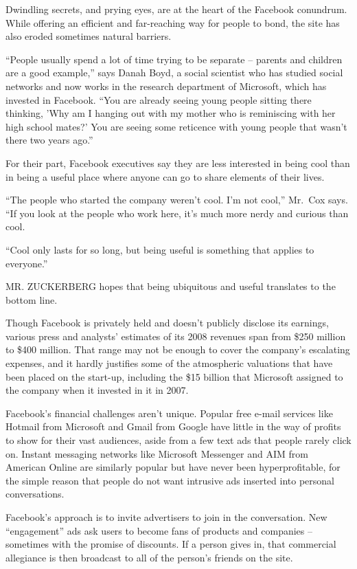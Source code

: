 \documentclass[12pt,a4paper,onecolumn]{article}
\begin{document}
Dwindling secrets, and prying eyes, are at the heart of the Facebook conundrum. While offering an
efficient and far-reaching way for people to bond, the site has also eroded sometimes natural
barriers.

``People usually spend a lot of time trying to be separate -- parents and children are a good
example,'' says Danah Boyd, a social scientist who has studied social networks and now works in the
research department of Microsoft, which has invested in Facebook. ``You are already seeing young
people sitting there thinking, 'Why am I hanging out with my mother who is reminiscing with her high
school mates?' You are seeing some reticence with young people that wasn't there two years ago.''

For their part, Facebook executives say they are less interested in being cool than in being a
useful place where anyone can go to share elements of their lives.

``The people who started the company weren't cool. I'm not cool,'' Mr.~Cox says. ``If you look at
the people who work here, it's much more nerdy and curious than cool.

``Cool only lasts for so long, but being useful is something that applies to everyone.''

MR. ZUCKERBERG hopes that being ubiquitous and useful translates to the bottom line.

Though Facebook is privately held and doesn't publicly disclose its earnings, various press and
analysts' estimates of its 2008 revenues span from \$250 million to \$400 million. That range may
not be enough to cover the company's escalating expenses, and it hardly justifies some of the
atmospheric valuations that have been placed on the start-up, including the \$15 billion that
Microsoft assigned to the company when it invested in it in 2007.

Facebook's financial challenges aren't unique. Popular free e-mail services like Hotmail from
Microsoft and Gmail from Google have little in the way of profits to show for their vast audiences,
aside from a few text ads that people rarely click on. Instant messaging networks like Microsoft
Messenger and AIM from American Online are similarly popular but have never been hyperprofitable,
for the simple reason that people do not want intrusive ads inserted into personal conversations.

Facebook's approach is to invite advertisers to join in the conversation. New ``engagement'' ads ask
users to become fans of products and companies -- sometimes with the promise of discounts. If a
person gives in, that commercial allegiance is then broadcast to all of the person's friends on the
site.
\end{document}
